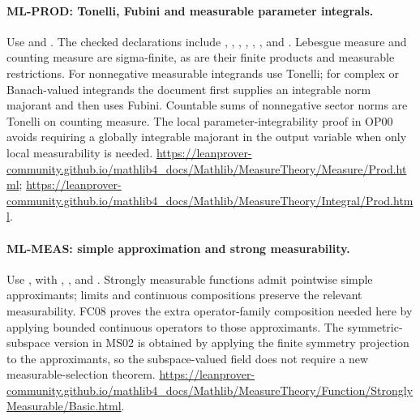 \documentclass[11pt,a4paper]{article}
\theoremstyle{remark}\newtheorem{remark}[theorem]{Remark}
\begin{document}
\hypertarget{leaf:ML-PROD}{}\paragraph{ML-PROD: Tonelli, Fubini and measurable parameter integrals.}
Use  and
. The checked declarations include
,
,
,
,
,
, and
.
Lebesgue measure and counting measure are sigma-finite, as are their finite products and measurable restrictions. For nonnegative measurable integrands use Tonelli; for complex or Banach-valued integrands the document first supplies an integrable norm majorant and then uses Fubini. Countable sums of nonnegative sector norms are Tonelli on counting measure. The local parameter-integrability proof in OP00 avoids requiring a globally integrable majorant in the output variable when only local measurability is needed.
\url{https://leanprover-community.github.io/mathlib4_docs/Mathlib/MeasureTheory/Measure/Prod.html};
\url{https://leanprover-community.github.io/mathlib4_docs/Mathlib/MeasureTheory/Integral/Prod.html}.

\hypertarget{leaf:ML-MEAS}{}\paragraph{ML-MEAS: simple approximation and strong measurability.}
Use , with
,
, and
.
Strongly measurable functions admit pointwise simple approximants; limits and continuous compositions preserve the relevant measurability. FC08 proves the extra operator-family composition needed here by applying bounded continuous operators to those approximants. The symmetric-subspace version in MS02 is obtained by applying the finite symmetry projection to the approximants, so the subspace-valued field does not require a new measurable-selection theorem.
\url{https://leanprover-community.github.io/mathlib4_docs/Mathlib/MeasureTheory/Function/StronglyMeasurable/Basic.html}.
\end{document}
